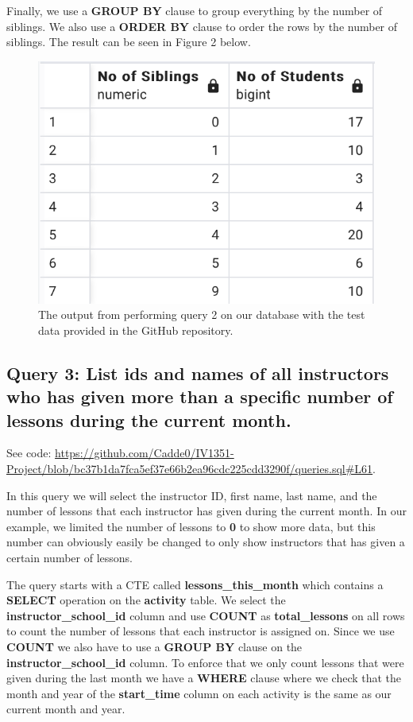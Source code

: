 \documentclass[a4paper]{scrartcl}
\begin{document}
Finally, we use a \textbf{GROUP BY} clause to group everything by the number of siblings. We also use a \textbf{ORDER BY} clause to order the rows by the number of siblings. The result can be seen in Figure 2 below.

\begin{figure}[H]
    \begin{center}
      \includegraphics[scale=0.6]{query2_output.png}
      \caption{The output from performing query 2 on our database with the test data provided in the GitHub repository.}
      \label{fig:diag}
    \end{center}
  \end{figure}


\subsection{Query 3: List ids and names of all instructors who has given more than a specific number of lessons during the current month.}
See code: \url{https://github.com/Cadde0/IV1351-Project/blob/bc37b1da7fca5ef37e66b2ea96cdc225cdd3290f/queries.sql#L61}.

In this query we will select the instructor ID, first name, last name, and the number of lessons that each instructor has given during the current month. In our example, we limited the number of lessons to \textbf{0} to show more data, but this number can obviously easily be changed to only show instructors that has given a certain number of lessons.

The query starts with a CTE called \textbf{lessons\_this\_month} which contains a \textbf{SELECT} operation on the \textbf{activity} table. We select the \textbf{instructor\_school\_id} column and use \textbf{COUNT} as \textbf{total\_lessons} on all rows to count the number of lessons that each instructor is assigned on. Since we use \textbf{COUNT} we also have to use a \textbf{GROUP BY} clause on the \textbf{instructor\_school\_id} column. To enforce that we only count lessons that were given during the last month we have a \textbf{WHERE} clause where we check that the month and year of the \textbf{start\_time} column on each activity is the same as our current month and year.
\end{document}
